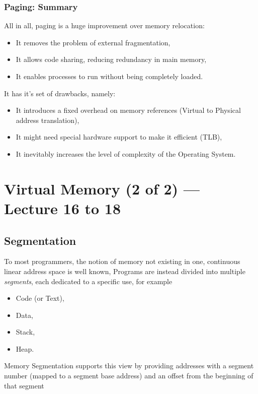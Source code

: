\documentclass[openright, twoside]{report}
\theoremstyle{definition}
\theoremstyle{example}
\begin{document}
\subsection{Paging: Summary}
All in all, paging is a huge improvement over memory relocation:
\begin{itemize}
	\item It removes the problem of external fragmentation,
	\item It allows code sharing, reducing redundancy in main memory,
	\item It enables processes to run without being completely loaded.
\end{itemize}

It has it's set of drawbacks, namely:

\begin{itemize}
	\item It introduces a fixed overhead on memory references (Virtual to Physical address translation),
	\item It might need special hardware support to make it efficient (TLB),
	\item It inevitably increases the level of complexity of the Operating System.
\end{itemize}






\chapter{Virtual Memory (2 of 2) --- Lecture 16 to 18}

\section{Segmentation}
To most programmers, the notion of memory not existing 
in one, continuous linear address space is well known, Programs
are instead divided into multiple \emph{segments}, each dedicated 
to a specific use, for example
\begin{itemize}
	\item Code (or Text),
	\item Data,
	\item Stack,
	\item Heap.
\end{itemize}

Memory Segmentation supports this view by providing addresses with 
a segment number (mapped to a segment base address) and an 
offset from the beginning of that segment
\end{document}
